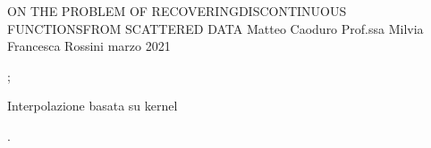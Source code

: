 
\slides


\fontfam[lm]\sans

\def\_titfont{\typosize[25/38]\bf \Blue}
\def\_subtitfont{\typosize[20/35]}

\tit  ON THE PROBLEM OF RECOVERING\nl DISCONTINUOUS FUNCTIONS\nl FROM SCATTERED DATA
\subtit  Matteo Caoduro Prof.ssa Milvia Francesca Rossini marzo 2021

\pg;

\sec Interpolazione basata su kernel


\pg.
